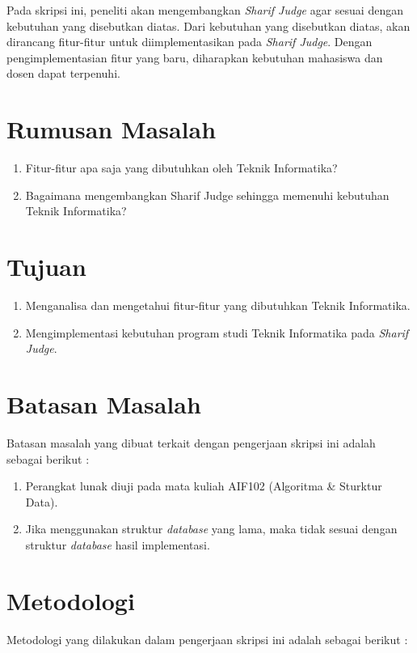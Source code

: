 Pada skripsi ini, peneliti akan mengembangkan \textit{Sharif Judge} agar sesuai dengan kebutuhan yang disebutkan diatas. Dari kebutuhan yang disebutkan diatas, akan dirancang fitur-fitur untuk diimplementasikan pada \textit{Sharif Judge}. Dengan pengimplementasian fitur yang baru, diharapkan kebutuhan mahasiswa dan dosen dapat terpenuhi.

\section{Rumusan Masalah}
\label{sec:rumusan}
\begin{enumerate}
	\item Fitur-fitur apa saja yang dibutuhkan oleh Teknik Informatika?
	\item Bagaimana mengembangkan Sharif Judge sehingga memenuhi kebutuhan Teknik Informatika?
\end{enumerate}

\section{Tujuan}
\label{sec:tujuan}
\begin{enumerate}
	\item Menganalisa dan mengetahui fitur-fitur yang dibutuhkan Teknik Informatika.
	\item Mengimplementasi kebutuhan program studi Teknik Informatika pada \textit{Sharif Judge}.
\end{enumerate}

\section{Batasan Masalah}
\label{sec:batasan}
Batasan masalah yang dibuat terkait dengan pengerjaan skripsi ini adalah sebagai berikut :
\begin{enumerate}
	\item Perangkat lunak diuji pada mata kuliah AIF102 (Algoritma \& Sturktur Data).
	\item Jika menggunakan struktur \textit{database} yang lama, maka tidak sesuai dengan struktur \textit{database} hasil implementasi.
\end{enumerate}

\section{Metodologi}
\label{sec:metlit}Metodologi yang dilakukan dalam pengerjaan skripsi ini adalah sebagai berikut :

